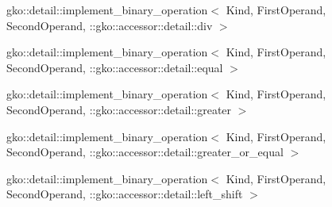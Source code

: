 \begin{DoxyCompactList}
\begin{DoxyCompactList}
\end{DoxyCompactList}
\item gko\+:\+:detail\+:\+:implement\+\_\+binary\+\_\+operation$<$ Kind, First\+Operand, Second\+Operand, \+:\+:gko\+:\+:accessor\+:\+:detail\+:\+:div $>$\begin{DoxyCompactList}
\item {}
\end{DoxyCompactList}
\item gko\+:\+:detail\+:\+:implement\+\_\+binary\+\_\+operation$<$ Kind, First\+Operand, Second\+Operand, \+:\+:gko\+:\+:accessor\+:\+:detail\+:\+:equal $>$\begin{DoxyCompactList}
\item {}
\end{DoxyCompactList}
\item gko\+:\+:detail\+:\+:implement\+\_\+binary\+\_\+operation$<$ Kind, First\+Operand, Second\+Operand, \+:\+:gko\+:\+:accessor\+:\+:detail\+:\+:greater $>$\begin{DoxyCompactList}
\item {}
\end{DoxyCompactList}
\item gko\+:\+:detail\+:\+:implement\+\_\+binary\+\_\+operation$<$ Kind, First\+Operand, Second\+Operand, \+:\+:gko\+:\+:accessor\+:\+:detail\+:\+:greater\+\_\+or\+\_\+equal $>$\begin{DoxyCompactList}
\item {}
\end{DoxyCompactList}
\item gko\+:\+:detail\+:\+:implement\+\_\+binary\+\_\+operation$<$ Kind, First\+Operand, Second\+Operand, \+:\+:gko\+:\+:accessor\+:\+:detail\+:\+:left\+\_\+shift $>$\begin{DoxyCompactList}
\item {}

\end{DoxyCompactList}
\end{DoxyCompactList}
